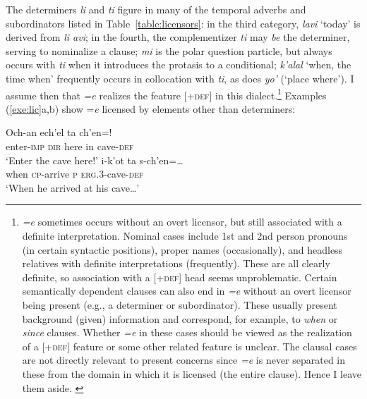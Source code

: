 \documentclass[output=paper,
modfonts
]{LSP/langsci}
\begin{document}
The determiners \emph{li} and \emph{ti} figure in many of the temporal adverbs and subordinators listed in Table~\ref{table:licensors}:
in the third category, \emph{lavi} `today' is derived from \emph{li avi}; in the fourth, the complementizer \emph{ti} may \emph{be}
the determiner, serving to nominalize a clause;  \emph{mi} is the polar question particle, but always occurs with \emph{ti} when it 
introduces the protasis to a conditional;  \emph{k'alal} `when, the time when' frequently occurs in collocation with \emph{ti}, as does \emph{yo'} (`place 
where'). I assume then that  \emph{=e} realizes the feature [\textsc{+def}]  in this dialect.\footnote
{\emph{=e} sometimes occurs without an overt licensor, but still associated with a definite interpretation. 
Nominal cases include 1st and 2nd person pronouns (in certain syntactic positions), proper names (occasionally), and headless relatives with definite interpretations (frequently). 
These are all clearly definite, so association with a [\textsc{+def}] head seems unproblematic.
Certain semantically dependent clauses can also end in \emph{=e} without an overt licensor being present  (e.g., a determiner or subordinator). 
These usually present background (given) information and correspond, for example, to  \emph{when} or \emph{since} clauses. 
Whether \emph{=e} in these cases should be viewed as the realization of a [+\textsc{def}] feature or some other related feature is unclear. 
 The clausal cases are not directly relevant to present concerns since \emph{=e} is never separated in these from the domain in which it is licensed  (the entire clause).
 Hence I leave them aside.
 \label{footnote:clausal}
 }
Examples (\ref{exe:lic}a,b) show =\emph{e} licensed by elements other than determiners:
\begin{exe}
\ex\label{exe:lic}
\begin{xlist}
\bridgeoverex
{}
\gll Och-an ech'el  ta ch'en=!\\
enter-\textsc{imp} \textsc{dir} here in cave-\textsc{def} \\
\glt `Enter the cave here!'  \citep[71]{laughlin1977}
\bridgeoverex
{}
\gll {} i-k'ot ta s-ch'en=\dots \\
when \textsc{cp}-arrive \textsc{p} \textsc{erg.3}-cave-\textsc{def} \\
\glt `When he arrived at his cave\dots' \citep[72]{laughlin1977}
\end{xlist}
\end{exe}
\end{document}
